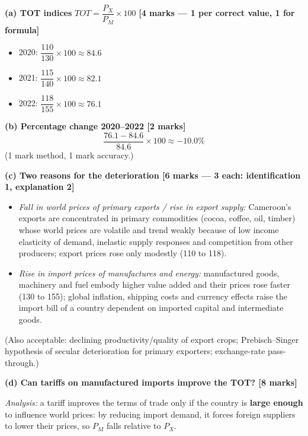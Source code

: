 \documentclass[11pt]{article}
\begin{document}
\begin{corrige}
\textbf{(a) TOT indices} $TOT = \dfrac{P_X}{P_M}\times 100$ \textbf{[4 marks — 1 per correct value, 1 for formula]}
\begin{itemize}
\item 2020: $\dfrac{110}{130}\times 100 \approx \mathbf{84.6}$
\item 2021: $\dfrac{115}{140}\times 100 \approx \mathbf{82.1}$
\item 2022: $\dfrac{118}{155}\times 100 \approx \mathbf{76.1}$
\end{itemize}

\textbf{(b) Percentage change 2020--2022 [2 marks]}
\[ \frac{76.1 - 84.6}{84.6}\times 100 \approx \mathbf{-10.0\%} \]
(1 mark method, 1 mark accuracy.)

\textbf{(c) Two reasons for the deterioration [6 marks — 3 each: identification 1, explanation 2]}
\begin{itemize}
\item \emph{Fall in world prices of primary exports / rise in export supply:} Cameroon's exports are concentrated in primary commodities (cocoa, coffee, oil, timber) whose world prices are volatile and trend weakly because of low income elasticity of demand, inelastic supply responses and competition from other producers; export prices rose only modestly (110 to 118).
\item \emph{Rise in import prices of manufactures and energy:} manufactured goods, machinery and fuel embody higher value added and their prices rose faster (130 to 155); global inflation, shipping costs and currency effects raise the import bill of a country dependent on imported capital and intermediate goods.
\end{itemize}
(Also acceptable: declining productivity/quality of export crops; Prebisch--Singer hypothesis of secular deterioration for primary exporters; exchange-rate pass-through.)

\textbf{(d) Can tariffs on manufactured imports improve the TOT? [8 marks]}

\emph{Analysis:} a tariff improves the terms of trade only if the country is \textbf{large enough} to influence world prices: by reducing import demand, it forces foreign suppliers to lower their prices, so $P_M$ falls relative to $P_X$.


\end{corrige}
\end{document}
